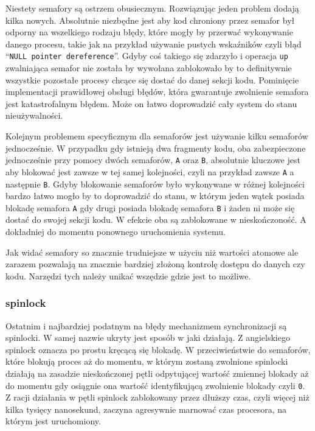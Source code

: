 \documentclass[10pt]{article}
\begin{document}
Niestety semafory są ostrzem obusiecznym. Rozwiązując jeden problem dodają kilka nowych. Absolutnie niezbędne jest aby kod chroniony przez semafor był odporny na wszelkiego rodzaju błędy, które mogły by przerwać wykonywanie danego procesu, takie jak na przykład używanie pustych wskaźników czyli błąd ``\texttt{NULL pointer dereference}''. Gdyby coś takiego się zdarzyło i operacja \texttt{up} zwalniająca semafor nie została by wywołana zablokowało by to definitywnie wszystkie pozostałe procesy chcące się dostać do danej sekcji kodu. Pominięcie implementacji prawidłowej obsługi błędów, która gwarantuje zwolnienie semafora jest katastrofalnym błędem. Może on łatwo doprowadzić cały system do stanu nieużywalności.

Kolejnym problemem specyficznym dla semaforów jest używanie kilku semaforów jednocześnie. W przypadku gdy istnieją dwa fragmenty kodu, oba zabezpieczone jednocześnie przy pomocy dwóch semaforów, \texttt{A} oraz \texttt{B}, absolutnie kluczowe jest aby blokować jest zawsze w tej samej kolejności, czyli na przykład zawsze \texttt{A} a następnie \texttt{B}. Gdyby blokowanie semaforów było wykonywane w różnej kolejności bardzo łatwo mogło by to doprowadzić do stanu, w którym jeden wątek posiada blokadę semafora \texttt{A} gdy drugi posiada blokadę semafora \texttt{B} i żaden ni może się dostać do swojej sekcji kodu. W efekcie oba są zablokowane w nieskończoność. A dokładniej do momentu ponownego uruchomienia systemu.

Jak widać semafory so znacznie trudniejsze w użyciu niż wartości atomowe ale zarazem pozwalają na znacznie bardziej złożoną kontrolę dostępu do danych czy kodu. Narzędzi tych należy unikać wszędzie gdzie jest to możliwe.

\subsubsection{spinlock}

Ostatnim i najbardziej podatnym na błędy mechanizmem synchronizacji są spinlocki. W samej nazwie ukryty jest sposób w jaki działają. Z angielskiego spinlock oznacza po prostu kręcącą się blokadę. W przeciwieństwie do semaforów, które blokują proces aż do momentu, w którym zostaną zwolnione spinlocki działają na zasadzie nieskończonej pętli odpytującej wartość zmiennej blokady aż do momentu gdy osiągnie ona wartość identyfikującą zwolnienie blokady czyli \texttt{0}. Z racji działania w pętli spinlock zablokowany przez dłuższy czas, czyli więcej niż kilka tysięcy nanosekund, zaczyna agresywnie marnować czas procesora, na którym jest uruchomiony.
\end{document}
